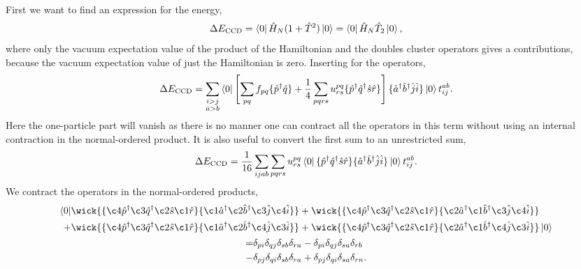 First we want to find an expression for the energy,
\begin{equation}
    \Delta E_{\text{CCD}} = \bra{0}\hat{H}_N (1 + \hat{T}^2) \ket{0}
        = \bra{0} \hat{H}_N \hat{T}_2 \ket{0},
\end{equation}
where only the vacuum expectation value of the product of the Hamiltonian and the 
doubles cluster operators gives a contributions, because the vacuum expectation value
of just the Hamiltonian is zero. Inserting for the operators,
\begin{equation}
    \Delta E_{\text{CCD}} 
        = \sum_{\substack{i>j \\ a>b}}\bra{0}\left[ 
        \sum_{pq} f_{pq} \{\hat{p}^\dagger \hat{q}\}
        + \frac{1}{4}\sum_{pqrs} u^{pq}_{rs} \{\hat{p}^\dagger\hat{q}^\dagger\hat{s}\hat{r}\}
        \right] 
        \{\hat{a}^\dagger\hat{b}^\dagger\hat{j}\hat{i} \}
        \ket{0}t^{ab}_{ij}.
\end{equation}
Here the one-particle part will vanish as there is no manner one can contract all the
operators in this term without using an internal contraction in the normal-ordered
product. It is also useful to convert the first sum to an unrestricted sum,
\begin{equation}
    \Delta E_{\text{CCD}}
        = \frac{1}{16}\sum_{ijab}\sum_{pqrs} u^{pq}_{rs} 
           \bra{0} 
           \{\hat{p}^\dagger\hat{q}^\dagger\hat{s}\hat{r}\} 
           \{\hat{a}^\dagger\hat{b}^\dagger\hat{j}\hat{i} \}
           \ket{0} t^{ab}_{ij}.
\end{equation}
We contract the operators in the normal-ordered products,
\begin{gather}
    \begin{aligned}
         \bra{0}
            &\wick{
            \{\c4{\hat{p}}^\dagger \c3{\hat{q}}^\dagger \c2{\hat{s}} \c1{\hat{r}} \} 
            \{\c1{\hat{a}}^\dagger \c2{\hat{b}}^\dagger \c3{\hat{j}} \c4{\hat{i}} \} 
            }
            +
            \wick{
            \{\c4{\hat{p}}^\dagger \c3{\hat{q}}^\dagger \c2{\hat{s}} \c1{\hat{r}} \} 
            \{\c2{\hat{a}}^\dagger \c1{\hat{b}}^\dagger \c3{\hat{j}} \c4{\hat{i}} \}
            } \\
            +
            &\wick{
            \{\c4{\hat{p}}^\dagger \c3{\hat{q}}^\dagger \c2{\hat{s}} \c1{\hat{r}} \} 
            \{\c1{\hat{a}}^\dagger \c2{\hat{b}}^\dagger \c4{\hat{j}} \c3{\hat{i}} \}
            }
            +
            \wick{
            \{\c4{\hat{p}}^\dagger \c3{\hat{q}}^\dagger \c2{\hat{s}} \c1{\hat{r}} \} 
            \{\c2{\hat{a}}^\dagger \c1{\hat{b}}^\dagger \c4{\hat{j}} \c3{\hat{i}} \}
            }
         \ket{0}
    \end{aligned} \\
    \begin{aligned}
        = &\delta_{pi}\delta_{qj}\delta_{sb}\delta_{ra} 
        - \delta_{pi}\delta_{qj}\delta_{sa}\delta_{rb} \\
        - &\delta_{pj}\delta_{qi}\delta_{sb}\delta_{ra} 
        + \delta_{pj}\delta_{qi}\delta_{sa}\delta_{rn}. 
    \end{aligned} 
\end{gather}
